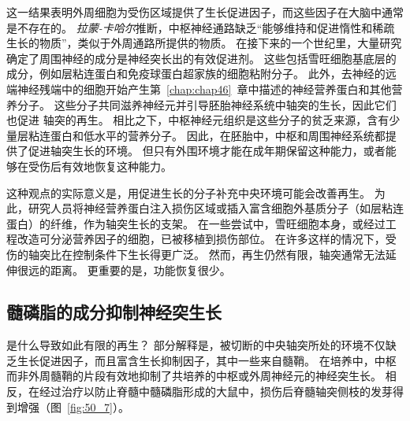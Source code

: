 这一结果表明外周细胞为受伤区域提供了生长促进因子，而这些因子在大脑中通常是不存在的。
\textit{拉蒙-卡哈尔}推断，中枢神经通路缺乏“能够维持和促进惰性和稀疏生长的物质”，类似于外周通路所提供的物质。
在接下来的一个世纪里，大量研究确定了周围神经的成分是神经突长出的有效促进剂。
这些包括雪旺细胞基底层的成分，例如层粘连蛋白和免疫球蛋白超家族的细胞粘附分子。
此外，去神经的远端神经残端中的细胞开始产生第~\ref{chap:chap46}~章中描述的神经营养蛋白和其他营养分子。
这些分子共同滋养神经元并引导胚胎神经系统中轴突的生长，因此它们也促进 轴突的再生。
相比之下，中枢神经元组织是这些分子的贫乏来源，含有少量层粘连蛋白和低水平的营养分子。
因此，在胚胎中，中枢和周围神经系统都提供了促进轴突生长的环境。
但只有外围环境才能在成年期保留这种能力，或者能够在受伤后有效地恢复这种能力。


这种观点的实际意义是，用促进生长的分子补充中央环境可能会改善再生。
为此，研究人员将神经营养蛋白注入损伤区域或插入富含细胞外基质分子（如层粘连蛋白）的纤维，作为轴突生长的支架。
在一些尝试中，雪旺细胞本身，或经过工程改造可分泌营养因子的细胞，已被移植到损伤部位。
在许多这样的情况下，受伤的轴突比在控制条件下生长得更广泛。
然而，再生仍然有限，轴突通常无法延伸很远的距离。
更重要的是，功能恢复很少。



\subsection{髓磷脂的成分抑制神经突生长}

是什么导致如此有限的再生？
部分解释是，被切断的中央轴突所处的环境不仅缺乏生长促进因子，而且富含生长抑制因子，其中一些来自髓鞘。
在培养中，中枢而非外周髓鞘的片段有效地抑制了共培养的中枢或外周神经元的神经突生长。
相反，在经过治疗以防止脊髓中髓磷脂形成的大鼠中，损伤后脊髓轴突侧枝的发芽得到增强（图~\ref{fig:50_7}）。


